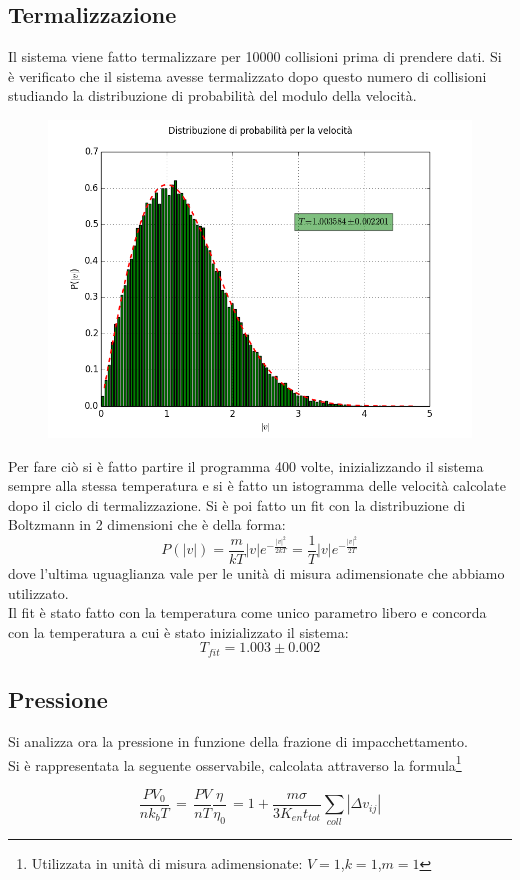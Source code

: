 \subsection{Termalizzazione}
Il sistema viene fatto termalizzare per 10000 collisioni prima di prendere dati.
Si è verificato che il sistema avesse termalizzato dopo questo numero di collisioni studiando la distribuzione di probabilità del modulo della velocità.\\
\begin{figure}[ht]
	\centering
	\includegraphics[scale=0.5]{sfere2D/boltzmann.png}
\end{figure}

Per fare ciò si è fatto partire il programma 400 volte, inizializzando il sistema sempre alla stessa temperatura e si è fatto un istogramma delle velocità calcolate dopo il ciclo di termalizzazione.
Si è poi fatto un fit con la distribuzione di Boltzmann in 2 dimensioni che è della forma:
$$
	P(|v|) = \frac{m}{k T} |v| e^{ - \frac{|v|^2}{2 k T}} = \frac{1}{T} |v| e^{ - \frac{|v|^2}{2T}}
$$
dove l'ultima uguaglianza vale per le unità di misura adimensionate che abbiamo utilizzato.\\
Il fit è stato fatto con la temperatura come unico parametro libero e concorda con la temperatura a cui è stato inizializzato il sistema:
$$
	T_{fit} = 1.003 \pm 0.002
$$


\subsection{Pressione}
Si analizza ora la pressione in funzione della frazione di impacchettamento.\\
Si è rappresentata la seguente osservabile, calcolata attraverso la formula\footnote{Utilizzata in unità di misura adimensionate: $V=1$,$k=1$,$m=1$}
\begin{center}
$$
	\frac{P V_0}{n k_{b} T} \, =\,  \frac{PV}{nT}\frac{\eta}{\eta_0} \, = 1 + \frac{m \sigma}{3 K_{en} t_{tot}} \sum_{coll} | \Delta v_{ij}| 
$$
\end{center}


